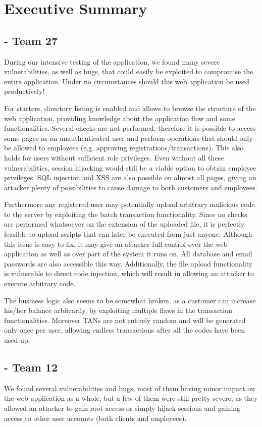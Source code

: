 \chapter{Executive Summary}


\section{\doge - Team 27}
During our intensive testing of the \doge{} application, we found many severe vulnerabilities, as well as bugs, that could easily be exploited to compromise the entire application. Under no circumstances should this web application be used productively! \newline

For starters, directory listing is enabled and allows to browse the structure of the web application, providing knowledge about the application flow and some functionalities. Several checks are not performed, therefore it is possible to access some pages as an unauthenticated user and perform operations that should only be allowed to employees (e.g. approving registrations/transactions). This also holds for users without sufficient role privileges. Even without all these vulnerabilities, session hijacking would still be a viable option to obtain employee privileges. SQL injection and XSS are also possible on almost all pages, giving an attacker plenty of possibilities to cause damage to both customers and employees. \newline

Furthermore any registered user may potentially upload arbitrary malicious code to the server by exploiting the batch transaction functionality. Since no checks are performed whatsoever on the extension of the uploaded file, it is perfectly feasible to upload scripts that can later be executed from just anyone. Although this issue is easy to fix, it may give an attacker full control over the web application as well as over part of the system it runs on. All database and email passwords are also accessible this way. Additionally, the file upload functionality is vulnerable to direct code injection, which will result in allowing an attacker to execute arbitrary code. \newline

The business logic also seems to be somewhat broken, as a customer can increase his/her balance arbitrarily, by exploiting multiple flaws in the transaction functionalities. Moreover TANs are not entirely random and will be generated only once per user, allowing endless transactions after all the codes have been used up.

\section{\gnb - Team 12}
We found several vulnerabilities and bugs, most of them having minor impact on the web application as a whole, but a few of them were still pretty severe, as they allowed an attacker to gain root access or simply hijack sessions and gaining access to other user accounts (both clients and employees). \newline